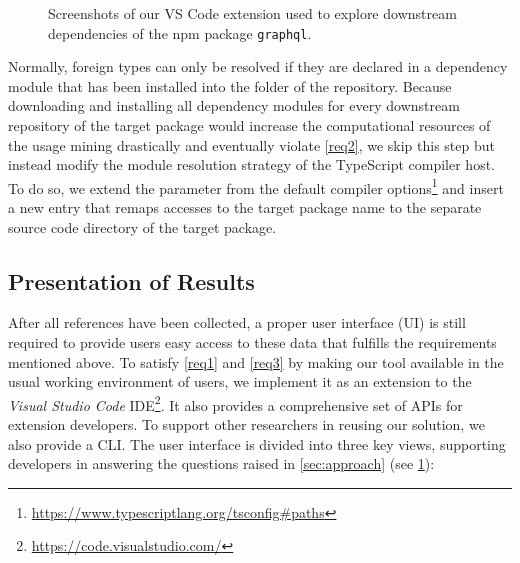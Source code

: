\documentclass[a4paper,twoside]{article}
\begin{document}
\begin{figure}[t]
    \caption{Screenshots of our VS Code extension used to explore downstream dependencies of the npm package \texttt{graphql}.}
    \label{fig:implementation/presentation/screenshots}
\end{figure}

Normally, foreign types can only be resolved if they are declared in a dependency module that has been installed into the  folder of the repository.
Because downloading and installing all dependency modules for every downstream repository of the target package would increase the computational resources of the usage mining drastically and eventually violate \cref{req2}, we skip this step but instead modify the module resolution strategy of the TypeScript compiler host.
To do so, we extend the  parameter from the default compiler options\footnote{\url{https://www.typescriptlang.org/tsconfig\#paths}} and insert a new entry that remaps accesses to the target package name to the separate source code directory of the target package.

\subsection{Presentation of Results}
\label{sec:implementation/presentation}

After all references have been collected, a proper user interface (UI) is still required to provide users easy access to these data that fulfills the requirements mentioned above.
To satisfy \cref{req1} and \cref{req3} by making our tool available in the usual working environment of users, we implement it as an extension to the \emph{Visual Studio Code} IDE\footnote{\url{https://code.visualstudio.com/}}.
It also provides a comprehensive set of APIs for extension developers.
To support other researchers in reusing our solution, we also provide a CLI.
The user interface is divided into three key views, supporting developers in answering the questions raised in \cref{sec:approach} (see \cref{fig:implementation/presentation/screenshots}):
\end{document}
